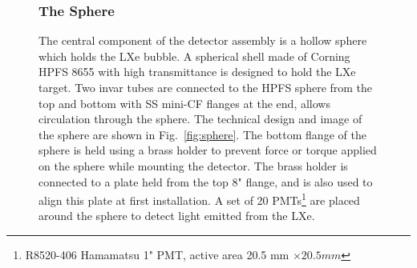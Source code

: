 \begin{figure}[h]
\subsubsection{The Sphere}
\label{subsubsec:sphere}

The central component of the detector assembly is a hollow sphere 
which holds the LXe bubble. A spherical shell made of Corning HPFS 8655 with high transmittance is 
designed to hold the LXe target. Two invar tubes 
are connected to the HPFS sphere from the top and bottom with 
SS mini-CF flanges at the end,  allows  circulation  through 
the sphere. The technical design and image of the sphere are shown in Fig.~\ref{fig:sphere}. 
The bottom flange of the sphere is held using a brass holder to prevent 
force or torque applied on the sphere while mounting the detector. The 
brass holder is connected to a plate held from the top 8" flange, and is 
also used to align this plate at first installation. A set of 20 
PMTs\footnote{R8520-406 Hamamatsu 1" PMT, active area 20.5 mm $\times 20.5 mm$} 
are placed around the sphere to detect light emitted from the LXe.



\end{figure}
